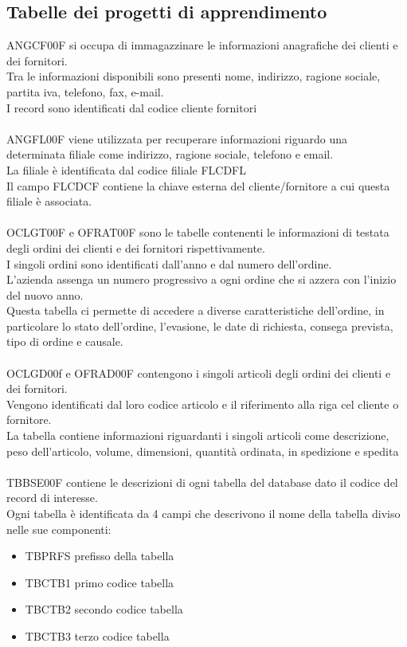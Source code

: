 \documentclass[target=bach,aauheader=,style=]{thud}
\begin{document}
\subsection{Tabelle dei progetti di apprendimento}
ANGCF00F si occupa di immagazzinare le informazioni anagrafiche dei clienti e dei fornitori. 
\\Tra le informazioni disponibili sono presenti nome, indirizzo, ragione sociale, partita iva, telefono, fax, e-mail.
\\I record sono identificati dal codice cliente fornitori
\\
\\ANGFL00F viene utilizzata per recuperare informazioni riguardo una determinata filiale come indirizzo, ragione sociale, telefono e email.
\\La filiale è identificata dal codice filiale FLCDFL
\\Il campo FLCDCF contiene la chiave esterna del cliente/fornitore a cui questa filiale è associata.
\\
\\OCLGT00F e OFRAT00F sono le tabelle contenenti le informazioni di testata degli ordini dei clienti e dei fornitori rispettivamente.
\\I singoli ordini sono identificati dall'anno e dal numero dell'ordine. 
\\L'azienda assenga un numero progressivo a ogni ordine che si azzera con l'inizio del nuovo anno.
\\Questa tabella ci permette di accedere a diverse caratteristiche dell'ordine, in particolare lo stato dell'ordine, l'evasione, le date di richiesta, consega prevista, tipo di ordine e causale.
\\
\\OCLGD00f e OFRAD00F contengono i singoli articoli degli ordini dei clienti e dei fornitori. 
\\Vengono identificati dal loro codice articolo e il riferimento alla riga cel cliente o fornitore.
\\La tabella contiene informazioni riguardanti i singoli articoli come descrizione, peso dell'articolo, volume, dimensioni, quantità ordinata, in spedizione e spedita
\\
\\TBBSE00F contiene le descrizioni di ogni tabella del database dato il codice del record di interesse.
\\Ogni tabella è identificata da 4 campi che descrivono il nome della tabella diviso nelle sue componenti:
\begin{itemize}
    \item TBPRFS prefisso della tabella
    \item TBCTB1 primo codice tabella
    \item TBCTB2 secondo codice tabella
    \item TBCTB3 terzo codice tabella
\end{itemize}
\end{document}
